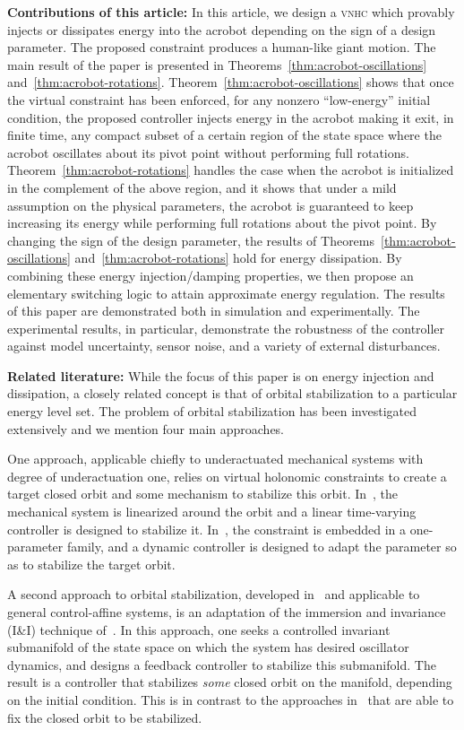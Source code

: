 \documentclass[journal,twoside,web, twocolumn]{ieeecolor}
\newcommand*{\vnhc}{\textsc{vnhc}\xspace}
\begin{document}
\textbf{Contributions of this article:}
In this article, we design a \vnhc which provably
injects or dissipates energy into the acrobot depending on the sign of a design parameter. The proposed constraint produces a human-like giant motion.
The main result of the paper is presented in Theorems~\ref{thm:acrobot-oscillations} and~\ref{thm:acrobot-rotations}.   Theorem~\ref{thm:acrobot-oscillations} shows that once the virtual constraint has been enforced, for any nonzero ``low-energy'' initial condition, the proposed controller injects energy in the acrobot making it exit, in finite time, any compact subset of a certain region of the state space where the acrobot oscillates about its pivot point without performing full rotations. Theorem~\ref{thm:acrobot-rotations} handles the case when the acrobot is initialized in the complement of the above region, and it shows that under a mild assumption on the physical parameters, the acrobot  is guaranteed to keep increasing its energy while performing full rotations about the pivot point. By changing the sign of the design parameter, the results of Theorems~\ref{thm:acrobot-oscillations} and~\ref{thm:acrobot-rotations} hold for energy dissipation. By combining these energy injection/damping properties, we then propose an elementary switching logic to attain approximate energy regulation. The results of this paper are demonstrated both in simulation and experimentally. The experimental results, in particular, demonstrate the robustness of the controller against model uncertainty, sensor noise, and a variety of external
disturbances. 

\textbf{Related literature:} While the focus of this paper is on energy injection and dissipation, a closely related concept is that of orbital stabilization to a particular energy level set. The  problem of orbital stabilization has been investigated extensively and we mention four main approaches.

  One approach, applicable chiefly to underactuated mechanical systems with degree of underactuation one, relies on virtual holonomic constraints to create a target closed orbit and some mechanism to stabilize this orbit. In~\cite{ShiPerWit05}, the mechanical system is linearized around the orbit and a linear time-varying controller is designed to stabilize it. In~\cite{dynamic_vhcs_stabilize_closed_orbits}, the constraint is embedded in a one-parameter family, and a dynamic controller is designed to adapt the parameter so as to stabilize the target orbit.

  A second approach to orbital stabilization, developed in~\cite{OrtYiRomAst20} and applicable to general control-affine systems, is an adaptation of the immersion and invariance (I\&I) technique of~\cite{AstOrt03}. In this approach, one seeks a controlled invariant submanifold of the state space on which the system has desired oscillator dynamics, and designs a feedback controller to stabilize this submanifold. The result is a controller that stabilizes \emph{some} closed orbit on the manifold, depending on the initial condition. This is in contrast to the approaches in~\cite{ShiPerWit05,dynamic_vhcs_stabilize_closed_orbits} that are able to fix the closed orbit to be stabilized.
\end{document}
